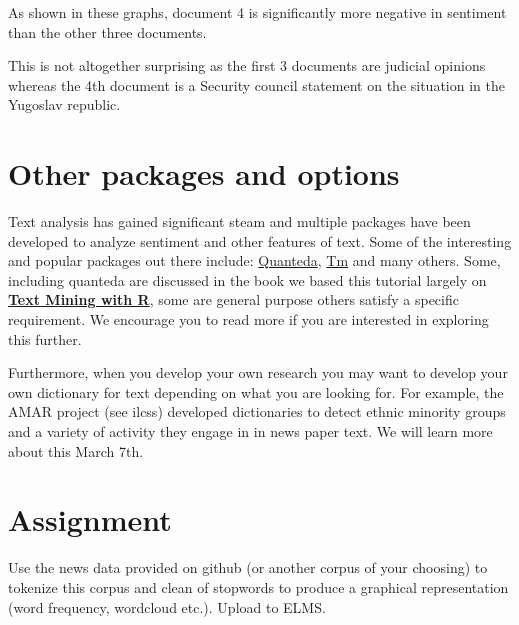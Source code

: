 \documentclass[
  letterpaper,
  DIV=11,
  numbers=noendperiod]{scrartcl}
\begin{document}
As shown in these graphs, document 4 is significantly more negative in
sentiment than the other three documents.

This is not altogether surprising as the first 3 documents are judicial
opinions whereas the 4th document is a Security council statement on the
situation in the Yugoslav republic.

\hypertarget{other-packages-and-options}{%
\section{Other packages and options}\label{other-packages-and-options}}

Text analysis has gained significant steam and multiple packages have
been developed to analyze sentiment and other features of text. Some of
the interesting and popular packages out there include:
\href{http://quanteda.io/}{Quanteda},
\href{https://cran.r-project.org/web/packages/tm/vignettes/tm.pdf}{Tm}
and many others. Some, including quanteda are discussed in the book we
based this tutorial largely on
\href{https://www.tidytextmining.com/index.html}{\textbf{Text Mining
with R}}, some are general purpose others satisfy a specific
requirement. We encourage you to read more if you are interested in
exploring this further.

Furthermore, when you develop your own research you may want to develop
your own dictionary for text depending on what you are looking for. For
example, the AMAR project (see ilcss) developed dictionaries to detect
ethnic minority groups and a variety of activity they engage in in news
paper text. We will learn more about this March 7th.

\hypertarget{assignment}{%
\section{Assignment}\label{assignment}}

Use the news data provided on github (or another corpus of your
choosing) to tokenize this corpus and clean of stopwords to produce a
graphical representation (word frequency, wordcloud etc.). Upload to
ELMS.
\end{document}
